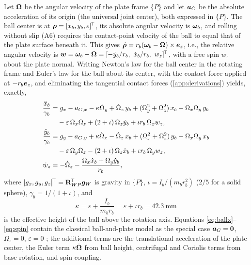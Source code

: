Let $\bm{\Omega}$ be the angular velocity of the plate frame $\{P\}$ and let $\bm{a}_G$ be the absolute acceleration of its origin (the universal joint center), both expressed in $\{P\}$. The ball center is at $\bm{\rho}=[x_b,y_b,\varepsilon]^{\!\top}$, its absolute angular velocity is $\bm{\omega}_b$, and rolling without slip (A6) requires the contact-point velocity of the ball to equal that of the plate surface beneath it. This gives $\dot{\bm{\rho}}=r_b(\bm{\omega}_b-\bm{\Omega})\times\bm{e}_z$, i.e., the relative angular velocity is $\vect w=\vect\omega_b-\vect\Omega=[-\dot y_b/r_b,\ \dot x_b/r_b,\ w_z]\T$, with a free spin $w_z$ about the plate normal. Writing Newton's law for the ball center in the rotating frame and Euler's law for the ball about its center, with the contact force applied at $-r_b\bm{e}_z$, and eliminating the tangential contact forces (\ref{app:derivations}) yields, exactly,
\begin{align}
  \frac{\ddot x_b}{\gamma_b}&=g_x-a_{G,x}-\kappa\dot\Omega_y+\dot\Omega_z\,y_b+(\Omega_y^2+\Omega_z^2)\,x_b-\Omega_x\Omega_y\,y_b \notag\\
   &\quad-\varepsilon\,\Omega_x\Omega_z+(2+\iota)\,\Omega_z\dot y_b+\iota r_b\,\Omega_xw_z, \label{eq:ballx}\\
  \frac{\ddot y_b}{\gamma_b}&=g_y-a_{G,y}+\kappa\dot\Omega_x-\dot\Omega_z\,x_b+(\Omega_x^2+\Omega_z^2)\,y_b-\Omega_x\Omega_y\,x_b \notag\\
   &\quad-\varepsilon\,\Omega_y\Omega_z-(2+\iota)\,\Omega_z\dot x_b+\iota r_b\,\Omega_yw_z, \label{eq:bally}\\
  \dot w_z&=-\dot\Omega_z-\frac{\Omega_x\dot x_b+\Omega_y\dot y_b}{r_b}, \label{eq:spin}
\end{align}
where $[g_x,g_y,g_z]^{\!\top}=\mathbf{R}_{WP}^{\!\top}\bm{g}_W$ is gravity in $\{P\}$, $\iota=I_b/(m_br_b^2)$ ($2/5$ for a solid sphere), $\gamma_b=1/(1+\iota)$, and
\begin{equation}
  \kappa=\varepsilon+\frac{I_b}{m_br_b}=\varepsilon+\iota r_b=\SI{42.3}{\milli\metre}
  \label{eq:kappa}
\end{equation}
is the effective height of the ball above the rotation axis. Equations \eqref{eq:ballx}--\eqref{eq:spin} contain the classical ball-and-plate model as the special case $\bm{a}_G=\bm{0}$, $\Omega_z=0$, $\varepsilon=0$ \cite{awtar2002,hauser1992}; the additional terms are the translational acceleration of the plate center, the Euler term $\kappa\dot{\bm{\Omega}}$ from ball height, centrifugal and Coriolis terms from base rotation, and spin coupling.

